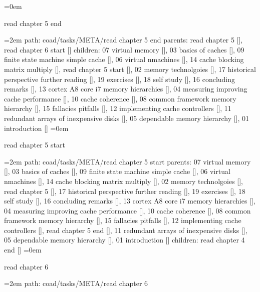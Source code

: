 \smallskip
\leftskip=0em
\par\endgroup
\bigskip
{}
read chapter 5 end
\smallskip
\par\begingroup
\leftskip=2em
path: coad/tasks/META/read chapter 5 end
\smallskip
parents:  read chapter 5 [], read chapter 6 start []
\smallskip
children: 07 virtual memory [], 03 basics of caches [], 09 finite state machine simple cache [], 06 virtual nmachines [], 14 cache blocking matrix multiply [], read chapter 5 start [], 02 memory technolgoies [], 17 historical perspective further reading [], 19 exercises [], 18 self study [], 16 concluding remarks [], 13 cortex A8 core i7 memory hierarchies [], 04 measuring improving cache performance [], 10 cache coherence [], 08 common framework memory hierarchy [], 15 fallacies pitfalls [], 12 implementing cache controllers [], 11 redundant arrays of inexpensive disks [], 05 dependable memory hierarchy [], 01 introduction []
\smallskip
\leftskip=0em
\par\endgroup
\bigskip
{}
read chapter 5 start
\smallskip
\par\begingroup
\leftskip=2em
path: coad/tasks/META/read chapter 5 start
\smallskip
parents:  07 virtual memory [], 03 basics of caches [], 09 finite state machine simple cache [], 06 virtual nmachines [], 14 cache blocking matrix multiply [], 02 memory technolgoies [], read chapter 5 [], 17 historical perspective further reading [], 19 exercises [], 18 self study [], 16 concluding remarks [], 13 cortex A8 core i7 memory hierarchies [], 04 measuring improving cache performance [], 10 cache coherence [], 08 common framework memory hierarchy [], 15 fallacies pitfalls [], 12 implementing cache controllers [], read chapter 5 end [], 11 redundant arrays of inexpensive disks [], 05 dependable memory hierarchy [], 01 introduction []
\smallskip
children: read chapter 4 end []
\smallskip
\leftskip=0em
\par\endgroup
\bigskip
{}
read chapter 6
\smallskip
\par\begingroup
\leftskip=2em
path: coad/tasks/META/read chapter 6
